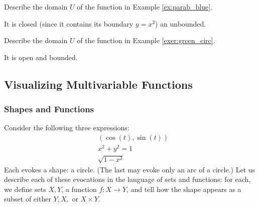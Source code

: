 \documentclass[12pt,letterpaper,reqno]{article}
\numberwithin{equation}{section}
\begin{document}
{\begin{exercise}
Describe the domain $U$ of the function in Example	\ref{ex:parab_blue}.
\end{exercise}

{\color{red}
\begin{solution}
	It is closed (since it contains its boundary $y=x^2$) an unbounded. 
\end{solution}}

\begin{exercise}
Describe the domain $U$ of the function in Example	\ref{exer:green_circ}.
\end{exercise}

{\color{red}
\begin{solution}
	It is open and bounded. 
\end{solution}}

\subsection{Visualizing Multivariable Functions}
\subsubsection{Shapes and Functions}
Consider the following three expressions:
\begin{align*}
	&(\cos(t),\sin(t)) \\
	&x^2+y^2=1 \\
	&\sqrt{1-x^2}
\end{align*}
Each evokes a shape: a circle. (The last may evoke only an arc of a circle.) Let us describe each of these evocations in the language of sets and functions: for each, we define sets $X,Y$, a function $f:X \to Y$, and tell how the shape appears as a subset of either $Y,X,$ or $X \times Y$.

}
\end{document}
